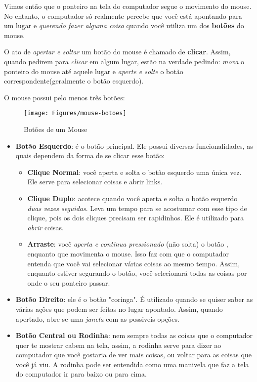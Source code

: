 \documentclass[hidelinks,12pt]{article}
\begin{document}
Vimos então que o ponteiro na tela do computador segue o movimento do mouse. No entanto, o computador só realmente percebe que você está apontando para um lugar e \emph{querendo fazer alguma coisa} quando você utiliza um dos \textbf{botões} do mouse.

O ato de \emph{apertar e soltar} um botão do mouse é chamado de \textbf{clicar}. Assim, quando pedirem para \emph{clicar} em algum lugar, estão na verdade pedindo: \emph{mova} o ponteiro do mouse até aquele lugar e \emph{aperte e solte} o botão correspondente(geralmente o botão esquerdo).

O mouse possui pelo menos três botões:

\begin{figure}[!h]
	\centering
	\texttt{[image: Figures/mouse-botoes]}
	\caption{Botões de um Mouse}
	\label{fig:mouse-botoes}
\end{figure}

\begin{itemize}
	\item \textbf{Botão Esquerdo}: é o botão principal. Ele possui diversas funcionalidades, as quais dependem da forma de se clicar esse botão:
	
	\begin{itemize}
	    \item \textbf{Clique Normal}: você aperta e solta o botão esquerdo uma única vez. Ele serve para selecionar coisas e abrir links.
	    
	    \item \textbf{Clique Duplo}: acotece quando você aperta e solta o botão esquerdo \emph{duas vezes seguidas}. Leva um tempo para se acostumar com esse tipo de clique, pois os dois cliques precisam ser rapidinhos. Ele é utilizado para \emph{abrir} coisas.
	    
	    \item \textbf{Arraste}: você \emph{aperta e continua pressionado} (não solta) o botão , enquanto que movimenta o mouse. Isso faz com que o computador entenda que você vai selecionar várias coisas ao mesmo tempo. Assim, enquanto estiver segurando o botão, você selecionará todas as coisas por onde o seu ponteiro passar.
	\end{itemize}
	
	\item \textbf{Botão Direito}: ele é o botão "coringa". É utilizado quando se quiser saber as várias ações que podem ser feitas no lugar apontado. Assim, quando apertado, abre-se uma \emph{janela} com as possiveís opções.
	
	\item \textbf{Botão Central ou Rodinha}: nem sempre todas as coisas que o computador quer te mostrar cabem na tela, assim, a rodinha serve para dizer ao computador que você gostaria de ver mais coisas, ou voltar para as coisas que você já viu. A rodinha pode ser entendida como uma manivela que faz a tela do computador ir para baixo ou para cima.
\end{itemize}
\end{document}
